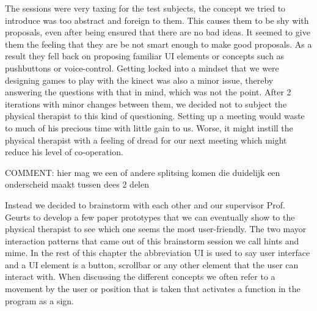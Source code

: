 The sessions were very taxing for the test subjects, the concept we tried to introduce was too abstract and foreign to them. This causes them to be shy with proposals, even after being ensured that there are no bad ideas. It seemed to give them the feeling that they are be not smart enough to make good proposals. As a result they fell back on proposing  familiar UI elements or concepts such as pushbuttons or voice-control. Getting locked into a mindset that we were designing games to play with the kinect was also a minor issue, thereby answering the questions with that in mind, which was not the point. After 2 iterations with minor changes between them, we decided not to subject the physical therapist to this kind of questioning. Setting up a meeting would waste to much of his precious time with little gain to us. Worse, it might instill the physical therapist with a feeling of dread for our next meeting which might reduce his level of co-operation. 

 {\large COMMENT: hier mag we een of andere splitsing komen die duidelijk een onderscheid maakt tussen dees 2 delen}

Instead we decided to brainstorm with each other and our supervisor Prof. Geurts to develop a few paper prototypes that we can eventually show to the physical therapist to see which one seems the most user-friendly. The two mayor interaction patterns that came out of this brainstorm session we call hints and mime. In the rest of this chapter the abbreviation UI is used to say user interface and a UI element is a button, scrollbar or any other element that the user can interact with. When discussing the different concepts we often refer to a movement by the user or position that is taken that activates a function in the program as a sign.

